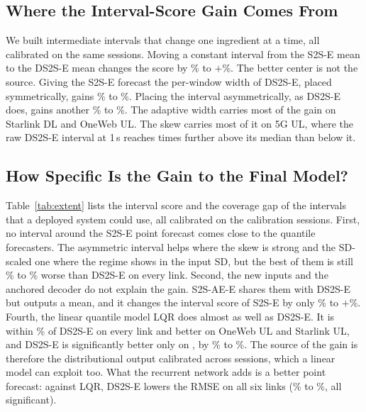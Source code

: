\subsection{Where the Interval-Score Gain Comes From}
We built intermediate intervals that change one ingredient at a time, all calibrated on the same sessions. Moving a constant interval from the S2S-E mean to the DS2S-E mean changes the score by \DecCentreLo\% to $+$\DecCentreHi\%. The better center is not the source. Giving the S2S-E forecast the per-window width of DS2S-E, placed symmetrically, gains \DecWidthLoAbs\% to \DecWidthHiAbs\%. Placing the interval asymmetrically, as DS2S-E does, gains another \DecAsymLoAbs\% to \DecAsymHiAbs\%. The adaptive width carries most of the gain on Starlink DL and OneWeb UL. The skew carries most of it on 5G UL, where the raw DS2S-E interval at 1\,s reaches \AsymQULratio{} times further above its median than below it.

\subsection{How Specific Is the Gain to the Final Model?}
Table~\ref{tab:extent} lists the interval score and the coverage gap of the intervals that a deployed system could use, all calibrated on the calibration sessions. First, no interval around the S2S-E point forecast comes close to the quantile forecasters. The asymmetric interval helps where the skew is strong and the SD-scaled one where the regime shows in the input SD, but the best of them is still \ExtBestPointLoAbs\% to \ExtBestPointHiAbs\% worse than DS2S-E on every link. Second, the new inputs and the anchored decoder do not explain the gain. S2S-AE-E shares them with DS2S-E but outputs a mean, and it changes the interval score of S2S-E by only \ExtFrfullLo\% to $+$\ExtFrfullHi\%. \GaussSentence{} Fourth, the linear quantile model LQR does almost as well as DS2S-E. It is within \ExtLQRMaxAbs\% of DS2S-E on every link and better on OneWeb UL and Starlink UL, and DS2S-E is significantly better only on \LQRsigLinks, by \LQRsigLo\% to \LQRsigHi\%. The source of the gain is therefore the distributional output calibrated across sessions, which a linear model can exploit too. What the recurrent network adds is a better point forecast: against LQR, DS2S-E lowers the RMSE on all six links (\LQRRMSELoAbs\% to \LQRRMSEHiAbs\%, all significant).

